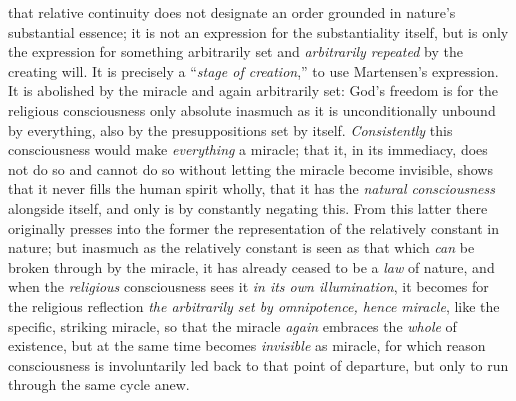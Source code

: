\documentclass[12pt,a4paper]{book}
\begin{document}
that relative continuity does not designate an order grounded in nature's substantial
essence; it is not an expression for the substantiality itself, but is only the expression
for something arbitrarily set and \emph{arbitrarily repeated} by the creating will. It is precisely
a ``\emph{stage of creation},'' to use Martensen's expression. It is abolished by the miracle and
again arbitrarily set: God's freedom is for the religious consciousness only absolute
inasmuch as it is unconditionally unbound by everything, also by the presuppositions set by
itself. \emph{Consistently} this consciousness would make \emph{everything} a miracle; that it, in its
immediacy, does not do so and cannot do so without letting the miracle become invisible,
shows that it never fills the human spirit wholly, that it has the \emph{natural consciousness}
alongside itself, and only is by constantly negating this.
From this latter there originally presses into the former the representation of the
relatively constant in nature; but inasmuch as the relatively constant is seen as that which
\emph{can} be broken through by the miracle, it has already ceased to be a \emph{law} of nature, and when
the \emph{religious} consciousness sees it \emph{in its own illumination}, it becomes for the religious
reflection \emph{the arbitrarily set by omnipotence, hence miracle}, like the specific, striking
miracle, so that the miracle \emph{again} embraces the \emph{whole} of existence, but at the same time
becomes \emph{invisible} as miracle, for which reason consciousness is involuntarily led back to
that point of departure, but only to run through the same cycle anew.
\end{document}
